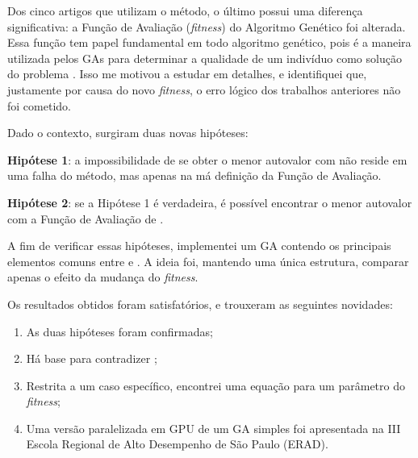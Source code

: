 	Dos cinco artigos que utilizam o método, o último \cite{metodo2011} possui uma diferença significativa: a Função de Avaliação (\emph{fitness}) do Algoritmo Genético foi alterada. Essa função tem papel fundamental em todo algoritmo genético, pois é a maneira utilizada pelos GAs para determinar a qualidade de um indivíduo como solução do problema \cite{Linden2008}. Isso me motivou a estudar \cite{metodo2011} em detalhes, e identifiquei que, justamente por causa do novo \emph{fitness}, o erro lógico dos trabalhos anteriores não foi cometido.
	
	Dado o contexto, surgiram duas novas hipóteses:
	
	\textbf{Hipótese 1}: a impossibilidade de se obter o menor autovalor com \cite{metodo2004} não reside em uma falha do método, mas apenas na má definição da Função de Avaliação.
	
	\textbf{Hipótese 2}: se a Hipótese 1 é verdadeira, é possível encontrar o menor autovalor com a Função de Avaliação de \cite{metodo2011}.
		
	A fim de verificar essas hipóteses, implementei um GA contendo os principais elementos comuns entre \cite{metodo2004} e \cite{metodo2011}. A ideia foi, mantendo uma única estrutura, comparar apenas o efeito da mudança do \emph{fitness}.
	
	Os resultados obtidos foram satisfatórios, e trouxeram as seguintes novidades:
	
	\begin{enumerate}
		\item As duas hipóteses foram confirmadas;
		\item Há base para contradizer \cite{metodo2004};
		\item Restrita a um caso específico, encontrei uma equação para um parâmetro do \emph{fitness};
		\item Uma versão paralelizada em GPU de um GA simples foi apresentada na III Escola Regional de Alto Desempenho de São Paulo (ERAD).
	\end{enumerate}